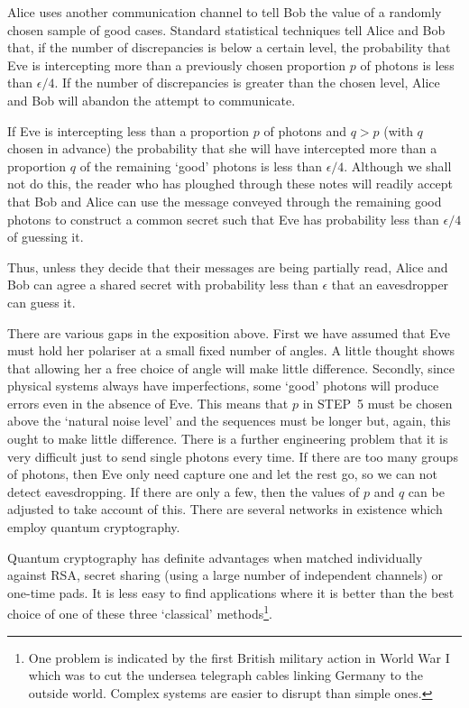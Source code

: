 \documentclass[12pt,a4paper]{article}
\theoremstyle{plain}
\theoremstyle{definition}
\begin{document}
 Alice uses another communication
channel to tell Bob the value of a randomly chosen sample
of good cases. Standard statistical techniques
tell Alice and Bob that, if the number of discrepancies
is below a certain level, the probability that
Eve is intercepting more than a previously 
chosen proportion $p$
of photons is less than $\epsilon/4$.
If the number of discrepancies is greater than the
chosen level, Alice and Bob will abandon 
the  attempt to communicate. 

 If Eve is intercepting less than a proportion $p$
of photons and $q>p$ (with $q$ chosen in advance)
the probability that she will have intercepted more than
a proportion $q$ of the remaining `good' photons is less than $\epsilon/4$.
Although we shall not do this, the reader who has
ploughed through these notes will readily accept that
Bob and Alice can use the message conveyed through the 
remaining good photons to construct 
a common secret such that Eve has probability 
less than $\epsilon/4$ of guessing
it.

Thus, unless they decide that their
messages are being partially read,
Alice and Bob can agree a shared secret
with probability less than $\epsilon$ that
an eavesdropper can guess it.

There are various gaps in the exposition above.
First we have assumed that Eve must hold her polariser
at a small fixed number of angles. A little thought
shows that allowing her a free choice of angle will make
little difference. Secondly, since physical systems
always have imperfections, some `good' photons
will produce errors even in the absence of
Eve. This means that $p$ in STEP~5 must
be chosen above the `natural noise level'
and the sequences must be longer but, again,
this ought to make little difference.
There is a further engineering problem that
it is very difficult just to send single photons
every time. If there are too many groups of photons,
then Eve only need capture one and let the rest go,
so we can not detect eavesdropping. If there are only a few,
then the values of $p$ and $q$ can be adjusted to
take account of this. There are several networks in existence
which employ quantum cryptography.

 
Quantum cryptography has definite advantages when
matched individually against RSA, secret sharing (using a large
number of independent channels) or one-time pads.
It is less easy to find applications where
it is better than the best choice of one of
these three `classical' methods\footnote{One problem
is indicated by the first British military action
in World War I which was to cut the undersea 
telegraph cables linking Germany to the outside world.
Complex systems are easier to disrupt than simple ones.}.
\end{document}
